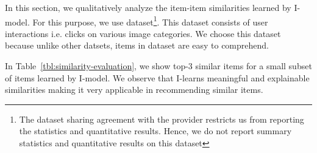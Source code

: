 In this section, we qualitatively analyze the item-item similarities learned by I-\LinearLow model. For this purpose, we use \Fotolia dataset\footnote{\scriptsize The dataset sharing agreement with the provider restricts us from reporting the statistics and quantitative results. Hence, we do not report summary statistics and quantitative results on this dataset}. This dataset consists of user interactions i.e. clicks on various image categories.
We choose this dataset because unlike other datsets, items in \Fotolia dataset are easy to comprehend.

In Table~\ref{tbl:similarity-evaluation}, we show top-3 similar items for a small subset of items learned by I-\LinearLow model. We observe that  I-\LinearLow learns meaningful and explainable similarities making it very applicable in recommending similar items.

